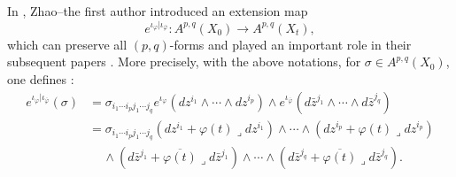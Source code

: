 \documentclass[12pt]{amsart}
\numberwithin{equation}{section}
\theoremstyle{definition}
\theoremstyle{definition}
\theoremstyle{definition}
\newcommand{\dz}{d \bar{z}}
\renewcommand{\1}{\mathsf{1}}
\renewcommand{\>}{\rightarrow}
\def\l{\lrcorner}
\theoremstyle{plain} %
\theoremstyle{plain} %
\theoremstyle{plain} %
\begin{document}
	In \cite{ZR15,RZ18}, Zhao--the first author  introduced an extension map
	$$\label{RZ}
	e^{\iota_{\varphi}|\iota_{\overline{\varphi}}}:
	A^{p,q}(X_0)\longrightarrow A^{p,q}(X_t),
	$$ which can preserve all $(p,q)$-forms and played an important role in their subsequent papers \cite{RWZ19,RWZ21}.  More precisely, with the above notations, for $\sigma\in A^{p,q}(X_0)$, one defines \cite[Definition 2.8]{RZ18}:
	\begin{equation}\label{explicit}
		\begin{aligned}
			e^{\iota_{\varphi}|\iota_{\overline{\varphi}}}(\sigma)
			&=\sigma_{i_1\cdots i_p {j}_1\cdots {j}_{q}} e^{\iota_\varphi}\left(d z^{i_{1}} \wedge \cdots \wedge dz^{i_{p}}\right) \wedge e^{\iota_{\overline{\varphi}}}\left(\dz^{j_{1}} \wedge \cdots \wedge \dz^{j_q}\right)\\
			&=\sigma_{i_1\cdots i_p {j}_1\cdots {j}_{q}}\left(d z^{i_{1}}+{\varphi(t)}\l  d z^{i_{1}}\right) \wedge \cdots \wedge\left(d z^{i_{ p}}+{\varphi(t)}\l d z^{i_{p}}\right)\\&\quad\, \wedge
			\left(\dz^{j_{1}}+{\overline{\varphi(t)}}\l \dz^{j_{1}}\right) \wedge \cdots \wedge\left(\dz^{j_{q}}+{\overline{\varphi(t)}}\l \dz^{j_{q}}\right).\\
		\end{aligned}
	\end{equation}
\end{document}
